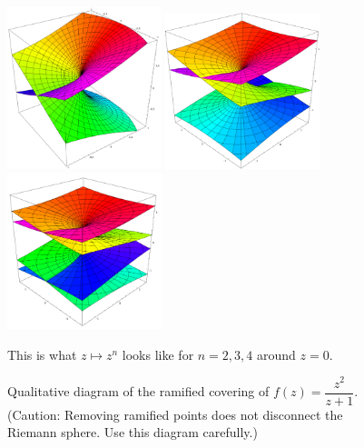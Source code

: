 \documentclass{article}
\begin{document}
  \begin{figure}[t]
  \centering
    \includegraphics[width=0.4\textwidth]{images/sqrt.png}
    \hfill
    \includegraphics[width=0.4\textwidth]{images/cube_root.png}
    \hfill
    \includegraphics[width=0.4\textwidth]{images/4th_root.png}
    \caption{This is what $z \mapsto z^n$ looks like for $n = 2, 3, 4$ around $z = 0$.}
  \end{figure}

  \begin{figure}
    \centering
    \vspace{5cm}
    \caption{Qualitative diagram of the ramified covering of $f(z) = \dfrac{z^2}{z+1}$. (Caution: Removing ramified points does not disconnect the Riemann sphere. Use this diagram carefully.) }
  \end{figure}
\end{document}
